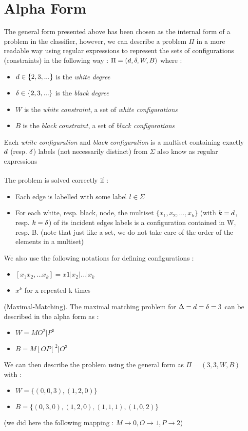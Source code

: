 \section{Alpha Form}\label{section:alpha}
The general form presented above has been chosen as the internal form of a problem in the classifier, however, we can describe a problem $\Pi$ in a more readable way using regular expressions \cite{1,LB_MM} to represent the sets of configurations (constraints) in the following way : $\Pi = (d,\delta,W,B)$ where :
\begin{itemize}
    \item $d\in\{2,3,...\}$ is the \textit{white degree}
    \item $\delta\in\{2,3,...\}$ is the \textit{black degree}
    \item $W$ is the \textit{white constraint}, a set of \textit{white configurations}
    \item $B$ is the \textit{black constraint}, a set of \textit{black configurations}
\end{itemize}
Each \textit{white configuration}  and \textit{black configuration} is a multiset containing exactly $d$ (resp. $\delta$) labels (not necessarily distinct) from $\Sigma$ also know as regular expressions\\\\
The problem is solved correctly if :
\begin{itemize}
    \item Each edge is labelled with some label $l\in\Sigma$
    \item For each white, resp. black, node, the multiset $\{x_1,x_2, ..., x_k\}$ (with $k=d$, resp. $k=\delta$) of its incident edges labels is a configuration contained in W, resp. B. (note that just like a set, we do not take care of the order of the elements in a multiset)
\end{itemize}
We also use the following notations for defining configurations :
\begin{itemize}
    \item $[x_1x_2,...x_k] = x1|x_2|...|x_k$
    \item $x^k$ for x repeated k times
\end{itemize}
\begin{exmp}
(Maximal-Matching). The maximal matching problem for $\Delta = d = \delta = 3$ can be described in the alpha form as :
\begin{itemize}
    \item $W = MO^{2}|P^{3}$
    \item $B = M[OP]^{2}|O^{3}$
\end{itemize}
We can then describe the problem using the general form as
$\Pi = (3,3,W,B)$ with :
\begin{itemize}
    \item $W = \{(0,0,3),(1, 2, 0)\}$
    \item $B = \{(0,3,0),(1,2,0),(1,1,1),(1,0,2)\}$
\end{itemize}
(we did here the following mapping : $M\rightarrow 0, O\rightarrow 1, P\rightarrow 2$)
\end{exmp}
